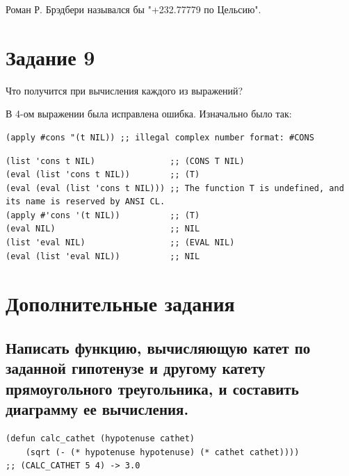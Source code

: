\documentclass[a4paper,14pt, unknownkeysallowed]{extreport}
\begin{document}
Роман Р. Брэдбери назывался бы "+232.77779 по Цельсию".

\section{Задание 9}

Что получится при вычисления каждого из выражений?\newline

В 4-ом выражении была исправлена ошибка. Изначально было так:
\begin{center}
\captionsetup{justification=raggedright,singlelinecheck=off}
\begin{lstlisting}[label=lst:parallel_processing,caption=Исходное 4-ое выражение]
(apply #cons "(t NIL)) ;; illegal complex number format: #CONS
\end{lstlisting}
\end{center}


\begin{center}
\captionsetup{justification=raggedright,singlelinecheck=off}
\begin{lstlisting}[label=lst:parallel_processing,caption=Решение задания 9]
(list 'cons t NIL)               ;; (CONS T NIL)
(eval (list 'cons t NIL))        ;; (T)
(eval (eval (list 'cons t NIL))) ;; The function T is undefined, and its name is reserved by ANSI CL.
(apply #'cons '(t NIL))          ;; (T)
(eval NIL)                       ;; NIL
(list 'eval NIL)                 ;; (EVAL NIL)
(eval (list 'eval NIL))          ;; NIL
\end{lstlisting}
\end{center}

\section{Дополнительные задания}

\subsection{Написать функцию, вычисляющую катет по заданной гипотенузе и другому катету прямоугольного треугольника, и составить диаграмму ее вычисления.}

\begin{center}
\captionsetup{justification=raggedright,singlelinecheck=off}
\begin{lstlisting}[label=lst:parallel_processing,caption=Решение дополнительного задания 1]
(defun calc_cathet (hypotenuse cathet)
	(sqrt (- (* hypotenuse hypotenuse) (* cathet cathet))))
;; (CALC_CATHET 5 4) -> 3.0
\end{lstlisting}
\end{center}
\end{document}
